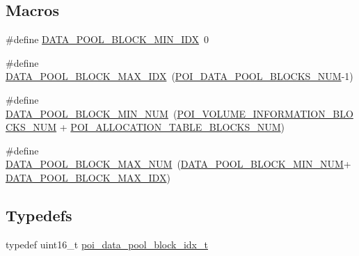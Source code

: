 \subsection*{Macros}
\begin{DoxyCompactItemize}
\item 
\#define \hyperlink{data-pool-block-manager_8h_ab249bb14ed04381809b0cfeffaa6e01d}{D\-A\-T\-A\-\_\-\-P\-O\-O\-L\-\_\-\-B\-L\-O\-C\-K\-\_\-\-M\-I\-N\-\_\-\-I\-D\-X}~0
\item 
\#define \hyperlink{data-pool-block-manager_8h_a7d56b75785e6fcf7a7e48cf1e0597fce}{D\-A\-T\-A\-\_\-\-P\-O\-O\-L\-\_\-\-B\-L\-O\-C\-K\-\_\-\-M\-A\-X\-\_\-\-I\-D\-X}~(\hyperlink{file-manager_8h_a6e4b52d19d492676f83a8576aba19a34}{P\-O\-I\-\_\-\-D\-A\-T\-A\-\_\-\-P\-O\-O\-L\-\_\-\-B\-L\-O\-C\-K\-S\-\_\-\-N\-U\-M}-\/1)
\item 
\#define \hyperlink{data-pool-block-manager_8h_ae9bd339a611ae2c33781964f7337dff5}{D\-A\-T\-A\-\_\-\-P\-O\-O\-L\-\_\-\-B\-L\-O\-C\-K\-\_\-\-M\-I\-N\-\_\-\-N\-U\-M}~(\hyperlink{file-manager_8h_a87ede160157563bbccc56097d4c431d7}{P\-O\-I\-\_\-\-V\-O\-L\-U\-M\-E\-\_\-\-I\-N\-F\-O\-R\-M\-A\-T\-I\-O\-N\-\_\-\-B\-L\-O\-C\-K\-S\-\_\-\-N\-U\-M} + \hyperlink{file-manager_8h_a555a4a22088989bb446cc085f19844ec}{P\-O\-I\-\_\-\-A\-L\-L\-O\-C\-A\-T\-I\-O\-N\-\_\-\-T\-A\-B\-L\-E\-\_\-\-B\-L\-O\-C\-K\-S\-\_\-\-N\-U\-M})
\item 
\#define \hyperlink{data-pool-block-manager_8h_a7154b2941bf1144d8886fdbafc64a1ff}{D\-A\-T\-A\-\_\-\-P\-O\-O\-L\-\_\-\-B\-L\-O\-C\-K\-\_\-\-M\-A\-X\-\_\-\-N\-U\-M}~(\hyperlink{data-pool-block-manager_8h_ae9bd339a611ae2c33781964f7337dff5}{D\-A\-T\-A\-\_\-\-P\-O\-O\-L\-\_\-\-B\-L\-O\-C\-K\-\_\-\-M\-I\-N\-\_\-\-N\-U\-M}+\hyperlink{data-pool-block-manager_8h_a7d56b75785e6fcf7a7e48cf1e0597fce}{D\-A\-T\-A\-\_\-\-P\-O\-O\-L\-\_\-\-B\-L\-O\-C\-K\-\_\-\-M\-A\-X\-\_\-\-I\-D\-X})
\end{DoxyCompactItemize}
\subsection*{Typedefs}
\begin{DoxyCompactItemize}
\item 
typedef uint16\-\_\-t \hyperlink{data-pool-block-manager_8h_a87e19ab8290bcd76be1c7db1e90cc6f6}{poi\-\_\-data\-\_\-pool\-\_\-block\-\_\-idx\-\_\-t}
\end{DoxyCompactItemize}
